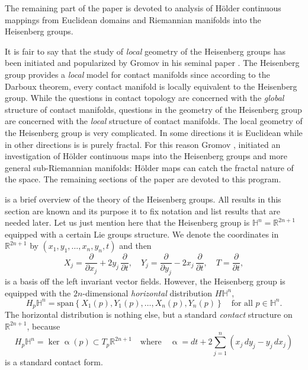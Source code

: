 \documentclass[intlimits,12pt,reqno]{amsart}
\newcommand{\bbbh}{\mathbb H}
\newcommand{\R}{\mathbb R}
\numberwithin{equation}{section}
\theoremstyle{definition}
\begin{document}
The remaining part of the paper is devoted to analysis of H\"older continuous mappings from Euclidean domains and Riemannian manifolds into the Heisenberg groups.

It is fair to say that the study of  {\em local} geometry of the Heisenberg groups has been initiated and popularized by Gromov in his seminal paper \cite{gromov2}. 
The Heisenberg group provides a {\em local} model for contact manifolds since according to the Darboux theorem, every contact manifold is locally equivalent to the Heisenberg group. While the questions in contact topology are concerned with the {\em global} structure of contact manifolds, questions in the geometry of the Heisenberg group are concerned with the {\em local} structure of contact manifolds.
The local geometry of the Heisenberg group is very complicated. In some directions it is Euclidean while in other directions is is purely fractal. For this reason Gromov \cite[0.5.C,0.5.D,3.1]{gromov2}, initiated an investigation of H\"older continuous maps into the Heisenberg groups and more general sub-Riemannian manifolds: H\"older maps can catch the fractal nature of the space. The remaining sections of the paper are devoted to this program.



 is a brief overview of the theory of the Heisenberg groups. All results in this section are known and its purpose it to fix notation and list results that are needed later. Let us just mention here that the Heisenberg group is $\bbbh^n=\R^{2n+1}$ equipped with a certain Lie groups structure. 
We denote the coordinates in $\R^{2n+1}$ by $(x_1,y_1,\ldots,x_n,y_n,t)$ and then
$$
X_j=\frac{\partial}{\partial x_j}+ 2y_j\, \frac{\partial}{\partial t},
\quad
Y_j=\frac{\partial}{\partial y_j}- 2x_j\, \frac{\partial}{\partial t},
\quad
T=\frac{\partial}{\partial t},
$$
is a basis off the left invariant vector fields. However, the Heisenberg group is equipped with the $2n$-dimensional {\em horizontal} distribution $H\bbbh^n$,
$$
H_p \bbbh^n = \text{span} \left\{ X_1(p),Y_1(p),\dots,X_n(p),Y_n(p) \right\} \quad \text{for all } p \in \bbbh^n.
$$
The horizontal distribution is nothing else, but a standard {\em contact} structure on $\R^{2n+1}$, because
\begin{equation}
\label{eq183}
H_p \bbbh^n = \operatorname{ker}\upalpha(p) \subset T_p\R^{2n+1}
\quad
\text{where}
\quad
\upalpha = dt + 2 \sum_{j=1}^n (x_j \, dy_j - y_j \, dx_j)
\end{equation}
is a standard contact form.
\end{document}
